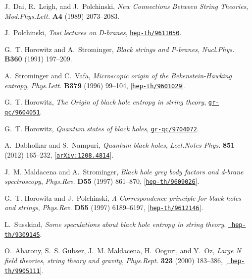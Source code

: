 \documentclass[12pt]{article}
\begin{document}
\begin{thebibliography}{100}
J.~Dai, R.~Leigh, and J.~Polchinski, {\it {New Connections Between String
  Theories}},  {\em Mod.Phys.Lett.} {\bf A4} (1989) 2073--2083.

J.~Polchinski, {\it {Tasi lectures on D-branes}},
  \href{http://xxx.lanl.gov/abs/hep-th/9611050}{{\tt hep-th/9611050}}.

G.~T. Horowitz and A.~Strominger, {\it {Black strings and P-branes}},  {\em
  Nucl.Phys.} {\bf B360} (1991) 197--209.

A.~Strominger and C.~Vafa, {\it {Microscopic origin of the Bekenstein-Hawking
  entropy}},  {\em Phys.Lett.} {\bf B379} (1996) 99--104,
  [\href{http://xxx.lanl.gov/abs/hep-th/9601029}{{\tt hep-th/9601029}}].

G.~T. Horowitz, {\it {The Origin of black hole entropy in string theory}},
  \href{http://xxx.lanl.gov/abs/gr-qc/9604051}{{\tt gr-qc/9604051}}.

G.~T. Horowitz, {\it {Quantum states of black holes}},
  \href{http://xxx.lanl.gov/abs/gr-qc/9704072}{{\tt gr-qc/9704072}}.

A.~Dabholkar and S.~Nampuri, {\it {Quantum black holes}},  {\em Lect.Notes
  Phys.} {\bf 851} (2012) 165--232,
  [\href{http://xxx.lanl.gov/abs/1208.4814}{{\tt arXiv:1208.4814}}].

J.~M. Maldacena and A.~Strominger, {\it {Black hole grey body factors and
  d-brane spectroscopy}},  {\em Phys.Rev.} {\bf D55} (1997) 861--870,
  [\href{http://xxx.lanl.gov/abs/hep-th/9609026}{{\tt hep-th/9609026}}].

G.~T. Horowitz and J.~Polchinski, {\it {A Correspondence principle for black
  holes and strings}},  {\em Phys.Rev.} {\bf D55} (1997) 6189--6197,
  [\href{http://xxx.lanl.gov/abs/hep-th/9612146}{{\tt hep-th/9612146}}].

L.~Susskind, {\it {Some speculations about black hole entropy in string
  theory}},  \href{http://xxx.lanl.gov/abs/hep-th/9309145}{{\tt
  hep-th/9309145}}.

O.~Aharony, S.~S. Gubser, J.~M. Maldacena, H.~Ooguri, and Y.~Oz, {\it {Large N
  field theories, string theory and gravity}},  {\em Phys.Rept.} {\bf 323}
  (2000) 183--386, [\href{http://xxx.lanl.gov/abs/hep-th/9905111}{{\tt
  hep-th/9905111}}].


\end{thebibliography}
\end{document}
